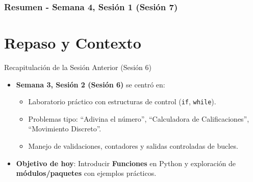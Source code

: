 \documentclass[10pt]{beamer}
\begin{document}
\myfront{}

\begin{frame}
  \titlepage
\end{frame}

\begin{frame}
  \frametitle{Resumen - Semana 4, Sesión 1 (Sesión 7)}
  \tableofcontents
\end{frame}


\section{Repaso y Contexto}

\begin{frame}{Recapitulación de la Sesión Anterior (Sesión 6)}
  \begin{itemize}
    \item \textbf{Semana 3, Sesión 2 (Sesión 6)} se centró en:
      \begin{itemize}
        \item Laboratorio práctico con estructuras de control (\texttt{if}, \texttt{while}).
        \item Problemas tipo: “Adivina el número”, “Calculadora de Calificaciones”, “Movimiento Discreto”.
        \item Manejo de validaciones, contadores y salidas controladas de bucles.
      \end{itemize}
    \item \textbf{Objetivo de hoy}: Introducir \textbf{Funciones} en Python y exploración de \textbf{módulos/paquetes} con ejemplos prácticos.
  \end{itemize}
\end{frame}
\end{document}
